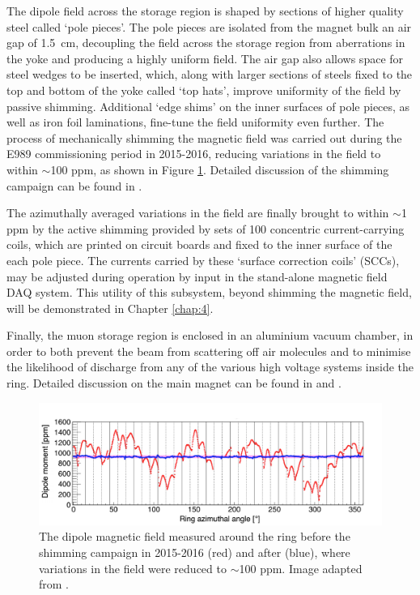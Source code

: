 The dipole field across the storage region is shaped by sections of higher quality steel called `pole pieces'. The pole pieces are isolated from the magnet bulk an air gap of \SI{1.5}{\centi\metre}, decoupling the field across the storage region from aberrations in the yoke and producing a highly uniform field. The air gap also allows space for steel wedges to be inserted, which, along with larger sections of steels fixed to the top and bottom of the yoke called `top hats', improve uniformity of the field by passive shimming. Additional `edge shims' on the inner surfaces of pole pieces, as well as iron foil laminations, fine-tune the field uniformity even further. The process of mechanically shimming the magnetic field was carried out during the E989 commissioning period in 2015-2016, reducing variations in the field to within $\sim$100 ppm, as shown in Figure \ref{fig:ShimmingResults}. Detailed discussion of the shimming campaign can be found in \cite{Smith}.

The azimuthally averaged variations in the field are finally brought to within $\sim$1 ppm by the active shimming provided by sets of 100 concentric current-carrying coils, which are printed on circuit boards and fixed to the inner surface of the each pole piece. The currents carried by these `surface correction coils' (SCCs), may be adjusted during operation by input in the stand-alone magnetic field DAQ system. This utility of this subsystem, beyond shimming the magnetic field, will be demonstrated in Chapter \ref{chap:4}.

Finally, the muon storage region is enclosed in an aluminium vacuum chamber, in order to both prevent the beam from scattering off air molecules and to minimise the likelihood of discharge from any of the various high voltage systems inside the ring. Detailed discussion on the main magnet can be found in \cite{TDR} and \cite{BNLMagnet}.
%
\begin{figure}[t!]
\centering{}
\includegraphics[trim={0 0 0 0},clip,width=.89\textwidth]{Images/Chapter3/ShimmingPlot.pdf}
\caption{The dipole magnetic field measured around the ring before the shimming campaign in 2015-2016 (red) and after (blue), where variations in the field were reduced to $\sim$100 ppm. Image adapted from \cite{ShimmingTalk}.}
\label{fig:ShimmingResults}
\end{figure}

